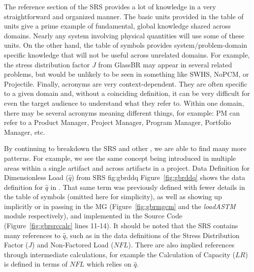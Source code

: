 The reference section of the SRS provides a lot of knowledge in a very 
straightforward and organized manner. The basic units provided in the table of 
units give a prime example of fundamental, global knowledge shared across 
domains. Nearly any system involving physical quantities will use some of these 
units. On the other hand, the table of symbols provides system/problem-domain 
specific knowledge that will not be useful across unrelated domains. For 
example, the stress distribution factor $J$ from GlassBR may appear in several 
related problems, but would be unlikely to be seen in something like SWHS, 
NoPCM, or Projectile. Finally, acronyms are very context-dependent. They are 
often specific to a given domain and, without a coinciding definition, it can 
be very difficult for even the target audience to understand what they refer 
to. Within one domain, there may be several acronyms meaning different things, 
for example: PM can refer to a Product Manager, Project Manager, Program 
Manager, Portfolio Manager, etc.

By continuing to breakdown the SRS and other \sfs{}, we are able to find many 
more patterns. For example, we see the same concept being introduced in 
multiple areas within a single artifact and across artifacts in a project.
{Data Definition for Dimensionless Load ($\hat{q}$) from \gb{} SRS}
{fig:gbrddq}
Figure~\ref{fig:gbrddq} shows the data definition for $\hat{q}$ in \gb{}. That 
same term was previously defined with fewer details in the table of symbols 
(omitted here for simplicity), as well as showing up implicitly or in passing 
in the MG (Figure~\ref{fig:gbrmgcm} and the \emph{loadASTM} module 
respectively), and implemented in the Source Code (Figure~\ref{fig:gbrsrccalc} 
lines 11-14). It should be noted that the SRS contains many references to 
$\hat{q}$, such as in the data definitions of the Stress Distribution Factor 
($J$) and Non-Factored Load ($NFL$). There are also implied references through 
intermediate calculations, for example the Calculation of Capacity ($LR$) is 
defined in terms of $NFL$ which relies on $\hat{q}$.

